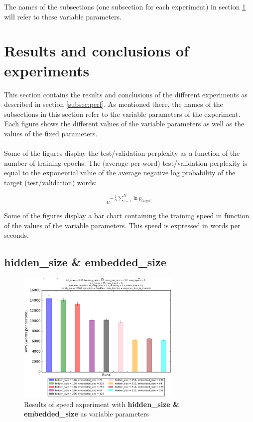 \documentclass[10pt,a4paper,titlepage]{article}
\begin{document}
\noindent
The names of the subsections (one subsection for each experiment) in section \ref{sec:results} will refer to these variable parameters.

\section{Results and conclusions of experiments}
\label{sec:results}

This section contains the results and conclusions of the different experiments as described in section \ref{subsec:perf}. As mentioned there, the names of the subsections in this section refer to the variable parameters of the experiment. Each figure shows the different values of the variable parameters as well as the values of the fixed parameters.\\
\\
Some of the figures display the test/validation perplexity as a function of the number of training epochs. The (average-per-word) test/validation perplexity is equal to the exponential value of the average negative log probability of the target (test/validation) words:

\[ e^{-\frac{1}{N} \sum_{i=1}^{N} \ln p_{target_{i}}} \]

\noindent
Some of the figures display a bar chart containing the training speed in function of the values of the variable parameters. This speed is expressed in words per seconds.

\subsection{hidden\_size \& embedded\_size}

\begin{figure}[H]
	\begin{center}
		\includegraphics[width=0.70\textwidth]{hidembspeed.eps}
		\caption{Results of speed experiment with \textbf{hidden\_size \& embedded\_size} as variable parameters}
		\label{fig:exp1speed}
	\end{center}	
\end{figure}
\end{document}
